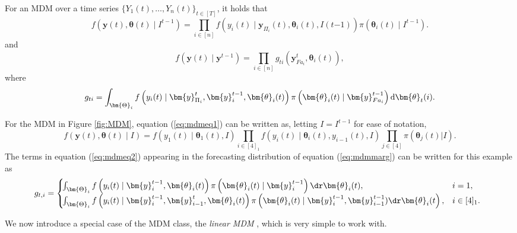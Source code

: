 \begin{proposition}
\label{prop:MDM2}
For an \gls{MDM} over a time series $\{Y_1(t),\dots,Y_n(t)\}_{t\in[T]}$, it holds that 
\begin{equation}
\label{eq:mdmeq1}
f(\bm{y}(t),\bm{\theta}(t)\;|\; I^{t-1})=\prod_{i\in[n]}f(y_i(t)\;|\;\bm{y}_{\Pi_i}(t),\bm{\theta}_i(t), I(t{-1}))\pi(\bm{\theta}_i(t)\;|\;I^{t-1}).
\end{equation}
and 
\begin{equation}
 \label{eq:mdmmarg}
 f\left(\bm{y}(t)\;|\;\bm{y}^{t-1}\right)=\prod_{i\in[n]} g_{ti}\left(\bm{y}^t_{Fa_i},\bm{\theta}_i(t)\right),
 \end{equation}
where
\begin{equation}
g_{ti}=\int_{\bm{\Theta}_i}f\left(y_i(t)\;|\;\bm{y}^{t}_{\Pi_i},\bm{y}^{t-1}_i,\bm{\theta}_i(t)\right)\pi\left(\bm{\theta}_i(t)\;|\;\bm{y}^{t-1}_{Fa_i}\right)\textnormal{d} \bm{\theta}_t(i).
\label{eq:mdmeq2}
\end{equation}
\end{proposition}

\begin{example}
For the \gls{MDM} in Figure \ref{fig:MDM}, equation (\ref{eq:mdmeq1}) can be written as, letting $I=I^{t-1}$ for ease of notation,
\begin{equation*}
\label{eq:factorizationMDMexample}
f(\bm{y}(t),\bm{\theta}(t)\;|\; I)=f(y_1(t)\;|\;\bm{\theta}_1(t),I)\prod_{i\in[4]_1}f(y_i(t)\;|\;\bm{\theta}_i(t),y_{i-1}(t),I)\prod_{j\in[4]}\pi(\bm{\theta}_j(t)|I).
\end{equation*}
The terms in equation (\ref{eq:mdmeq2}) appearing in the forecasting distribution of equation (\ref{eq:mdmmarg}) can be written for this example as
\begin{equation*}
g_{t,i}= 
\left\{
\begin{array}{ll}
\!\!\!\!\int_{\bm{\Theta}_i}f\left(y_i(t)\;|\; \bm{y}^{t-1}_i,\bm{\theta}_i(t)\right)\pi\left(\bm{\theta}_i(t)\;|\; \bm{y}^{t-1}_i\right)\dr \bm{\theta}_i(t), & i=1,\\
\!\!\!\!\int_{\bm{\Theta}_i}f\left(y_i(t)\;|\; \bm{y}^{t-1}_i,\bm{y}^t_{i-1},\bm{\theta}_i(t)\right)\pi\left(\bm{\theta}_i(t)\;|\; \bm{y}^{t-1}_i,\bm{y}^{t-1}_{i-1})\dr \bm{\theta}_i(t\right), & i\in[4]_1.
\end{array}
\right.
\label{eq:exampleMDMpredictive}
\end{equation*}
\end{example}

We now introduce a special case of the \gls{MDM} class, the \textit{linear \gls{MDM}} \citep{Queen1993}, which is very simple to work with. 

